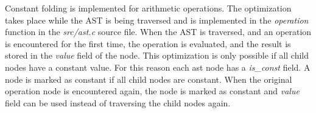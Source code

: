 Constant folding is implemented for arithmetic operations.
The optimization takes place while the AST is being traversed and is 
implemented in the \textit{operation} function in the \textit{src/ast.c} source file.
When the AST is traversed, and an operation is encountered for the
first time, the operation is evaluated, and the result is stored in the
\textit{value} field of the node. This optimization is only possible if 
all child nodes have a constant value. For this reason each ast node has a
\textit{is\_const} field. A node is marked as constant if all child nodes are
constant. When the original operation node is encountered again, the node is 
marked as constant and \textit{value} field can be used instead of traversing the
child nodes again.